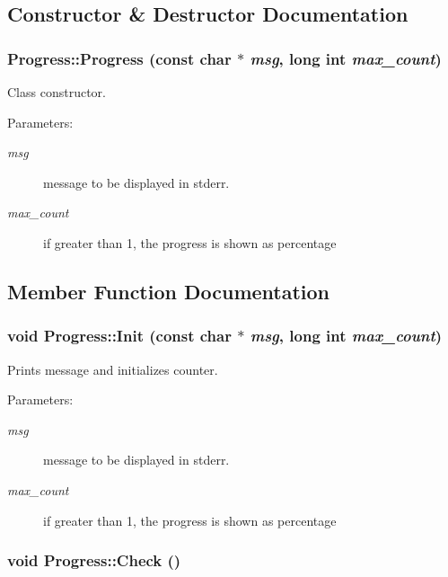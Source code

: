 \subsection{Constructor \& Destructor Documentation}
\hypertarget{classProgress_fc6164b4ac61db61319559b1b8cc99f2}{
\subsubsection[Progress]{\setlength{\rightskip}{0pt plus 5cm}Progress::Progress (const char $\ast$ {\em msg}, \/  long int {\em max\_\-count})}}
\label{classProgress_fc6164b4ac61db61319559b1b8cc99f2}


Class constructor. 

\begin{Desc}
\item[Parameters:]
\begin{description}
\item[{\em msg}]message to be displayed in stderr. \item[{\em max\_\-count}]if greater than 1, the progress is shown as percentage \end{description}
\end{Desc}


\subsection{Member Function Documentation}
\hypertarget{classProgress_3400f3a809c40b45b63c5196e701db8a}{
\subsubsection[Init]{\setlength{\rightskip}{0pt plus 5cm}void Progress::Init (const char $\ast$ {\em msg}, \/  long int {\em max\_\-count})}}
\label{classProgress_3400f3a809c40b45b63c5196e701db8a}


Prints message and initializes counter. 

\begin{Desc}
\item[Parameters:]
\begin{description}
\item[{\em msg}]message to be displayed in stderr. \item[{\em max\_\-count}]if greater than 1, the progress is shown as percentage \end{description}
\end{Desc}
\hypertarget{classProgress_58375cdfa5fc9e27d3db6c216c6c2248}{
\subsubsection[Check]{\setlength{\rightskip}{0pt plus 5cm}void Progress::Check ()}}
\label{classProgress_58375cdfa5fc9e27d3db6c216c6c2248}


